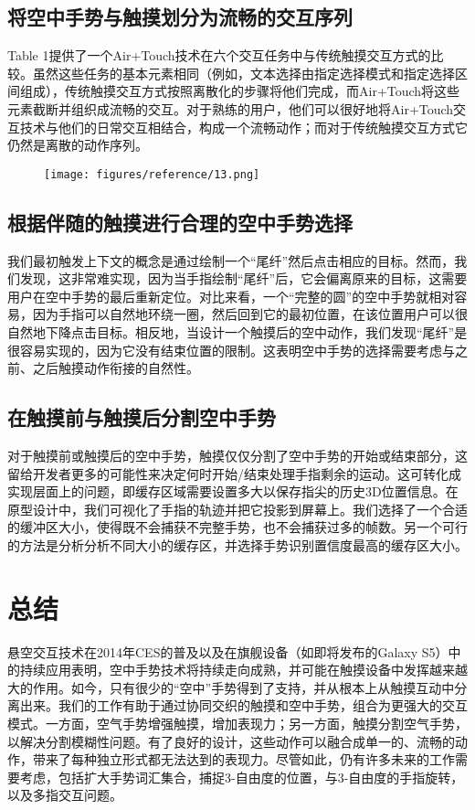 \subsection{将空中手势与触摸划分为流畅的交互序列}

Table 1提供了一个Air+Touch技术在六个交互任务中与传统触摸交互方式的比较。虽然这些任务的基本元素相同（例如，文本选择由指定选择模式和指定选择区间组成），传统触摸交互方式按照离散化的步骤将他们完成，而Air+Touch将这些元素截断并组织成流畅的交互。对于熟练的用户，他们可以很好地将Air+Touch交互技术与他们的日常交互相结合，构成一个流畅动作；而对于传统触摸交互方式它仍然是离散的动作序列。

\begin{figure}
\centering
\texttt{[image: figures/reference/13.png]}
\label{fig:ref_13}
\end{figure}

\subsection{根据伴随的触摸进行合理的空中手势选择}
我们最初触发上下文的概念是通过绘制一个“尾纤”然后点击相应的目标。然而，我们发现，这非常难实现，因为当手指绘制“尾纤”后，它会偏离原来的目标，这需要用户在空中手势的最后重新定位。对比来看，一个“完整的圆”的空中手势就相对容易，因为手指可以自然地环绕一圈，然后回到它的最初位置，在该位置用户可以很自然地下降点击目标。相反地，当设计一个触摸后的空中动作，我们发现“尾纤”是很容易实现的，因为它没有结束位置的限制。这表明空中手势的选择需要考虑与之前、之后触摸动作衔接的自然性。


\subsection{在触摸前与触摸后分割空中手势}

对于触摸前或触摸后的空中手势，触摸仅仅分割了空中手势的开始或结束部分，这留给开发者更多的可能性来决定何时开始/结束处理手指剩余的运动。这可转化成实现层面上的问题，即缓存区域需要设置多大以保存指尖的历史3D位置信息。在原型设计中，我们可视化了手指的轨迹并把它投影到屏幕上。我们选择了一个合适的缓冲区大小，使得既不会捕获不完整手势，也不会捕获过多的帧数。另一个可行的方法是分析分析不同大小的缓存区，并选择手势识别置信度最高的缓存区大小。

\section{总结}

悬空交互技术在2014年CES的普及以及在旗舰设备（如即将发布的Galaxy S5）中的持续应用表明，空中手势技术将持续走向成熟，并可能在触摸设备中发挥越来越大的作用。如今，只有很少的“空中”手势得到了支持，并从根本上从触摸互动中分离出来。我们的工作有助于通过协同交织的触摸和空中手势，组合为更强大的交互模式。一方面，空气手势增强触摸，增加表现力；另一方面，触摸分割空气手势，以解决分割模糊性问题。有了良好的设计，这些动作可以融合成单一的、流畅的动作，带来了每种独立形式都无法达到的表现力。尽管如此，仍有许多未来的工作需要考虑，包括扩大手势词汇集合，捕捉3-自由度的位置，与3-自由度的手指旋转，以及多指交互问题。

